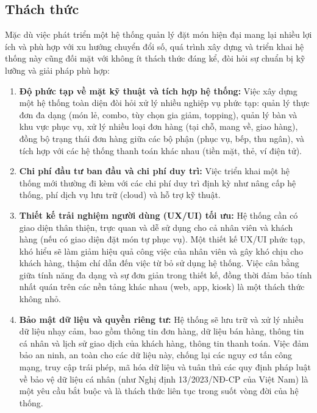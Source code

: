 
\subsection{Thách thức}

Mặc dù việc phát triển một hệ thống quản lý đặt món hiện đại mang lại nhiều lợi ích và phù hợp với xu hướng chuyển đổi số, quá trình xây dựng và triển khai hệ thống này cũng đối mặt với không ít thách thức đáng kể, đòi hỏi sự chuẩn bị kỹ lưỡng và giải pháp phù hợp:

\begin{enumerate}
    \item \textbf{Độ phức tạp về mặt kỹ thuật và tích hợp hệ thống:}
    Việc xây dựng một hệ thống toàn diện đòi hỏi xử lý nhiều nghiệp vụ phức tạp: quản lý thực đơn đa dạng (món lẻ, combo, tùy chọn gia giảm, topping), quản lý bàn và khu vực phục vụ, xử lý nhiều loại đơn hàng (tại chỗ, mang về, giao hàng), đồng bộ trạng thái đơn hàng giữa các bộ phận (phục vụ, bếp, thu ngân), và tích hợp với các hệ thống thanh toán khác nhau (tiền mặt, thẻ, ví điện tử).

    \item \textbf{Chi phí đầu tư ban đầu và chi phí duy trì:}
    Việc triển khai một hệ thống mới thường đi kèm với các chi phí duy trì định kỳ như nâng cấp hệ thống, phí dịch vụ lưu trữ (cloud) và hỗ trợ kỹ thuật.

    \item \textbf{Thiết kế trải nghiệm người dùng (UX/UI) tối ưu:}
    Hệ thống cần có giao diện thân thiện, trực quan và dễ sử dụng cho cả nhân viên và khách hàng (nếu có giao diện đặt món tự phục vụ). Một thiết kế UX/UI phức tạp, khó hiểu sẽ làm giảm hiệu quả công việc của nhân viên và gây khó chịu cho khách hàng, thậm chí dẫn đến việc từ bỏ sử dụng hệ thống. Việc cân bằng giữa tính năng đa dạng và sự đơn giản trong thiết kế, đồng thời đảm bảo tính nhất quán trên các nền tảng khác nhau (web, app, kiosk) là một thách thức không nhỏ.

    \item \textbf{Bảo mật dữ liệu và quyền riêng tư:}
    Hệ thống sẽ lưu trữ và xử lý nhiều dữ liệu nhạy cảm, bao gồm thông tin đơn hàng, dữ liệu bán hàng, thông tin cá nhân và lịch sử giao dịch của khách hàng, thông tin thanh toán. Việc đảm bảo an ninh, an toàn cho các dữ liệu này, chống lại các nguy cơ tấn công mạng, truy cập trái phép, mã hóa dữ liệu và tuân thủ các quy định pháp luật về bảo vệ dữ liệu cá nhân (như Nghị định 13/2023/NĐ-CP của Việt Nam) là một yêu cầu bắt buộc và là thách thức liên tục trong suốt vòng đời của hệ thống.


\end{enumerate}
